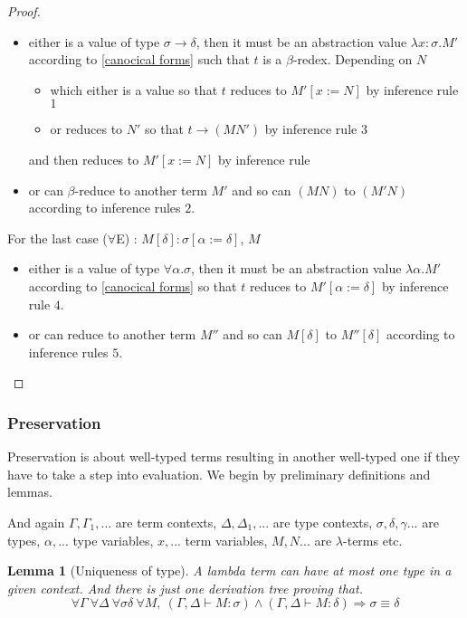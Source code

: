 \documentclass{article}
\newtheorem{lemma}[theorem]{Lemma}
\begin{document}
\begin{proof}
        \begin{itemize}
            \item either is a value of type $\sigma\rightarrow\delta$, then it must be an abstraction value $\lambda x : \sigma.M'$ according to 
            \ref{canocical forms} such that $t$ is a $\beta$-redex. Depending on $N$
            \begin{itemize}
                \item which either is a value so that $t$ reduces to $M'[x:=N]$ by inference rule $1$
                \item or reduces to $N'$ so that $t\rightarrow(M N')$ by inference rule $3$
            \end{itemize} and then reduces to $M'[x:=N]$ by inference rule 
            \item or can $\beta$-reduce to another term $M'$ and so can $(M N)$ to $(M' N)$ according to inference rules $2$.
        \end{itemize}
        \par For the last case ($\forall$E) : $M[\delta]:\sigma[\alpha:=\delta]$, $M$
        \begin{itemize}
            \item either is a value of type $\forall\alpha.\sigma$, then it must be an abstraction value $\lambda \alpha .M'$ according to 
            \ref{canocical forms}  so that $t$ reduces to $M'[\alpha:=\delta]$ by inference rule $4$.
            \item or can reduce to another term $M''$ and so can $M[\delta]$ to $M''[\delta]$ according to inference rules $5$.
        \end{itemize}
        
    \end{proof}
    \subsubsection{Preservation}
    Preservation is about well-typed terms resulting in another well-typed one if they have to take a step into evaluation. We begin by preliminary definitions and lemmas.\par And again  $\Gamma, \Gamma_1, ...$ are term contexts, $\Delta, \Delta_1,...$ are type contexts, $\sigma, \delta, \gamma ...$ are types, $\alpha, ...$ type variables, $x, ...$ term variables, $M, N...$ are $\lambda$-terms etc.

    \begin{lemma}[Uniqueness of type]\label{uniqueness of type}
        A lambda term can have at most one type in a given context. And there is just one derivation tree proving that.
        $$\forall\Gamma\ \forall\Delta\ \forall\sigma\delta\ \forall M,\ (\Gamma,\Delta \vdash M : \sigma) \wedge (\Gamma,\Delta \vdash M : \delta) \Rightarrow \sigma \equiv \delta$$
    \end{lemma}
    
\end{document}

